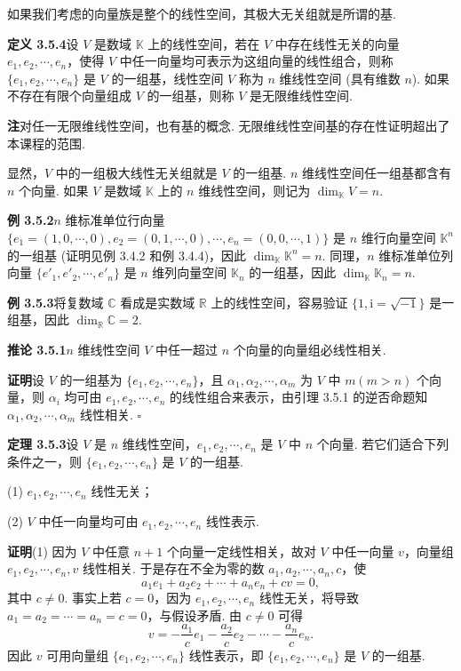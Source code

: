 \documentclass[UTF8, 12pt, fontset=fandol, oneside]{ctexart}
\begin{document}
如果我们考虑的向量族是整个的线性空间，其极大无关组就是所谓的基.

\noindent\textbf{定义 3.5.4}\quad 设 $V$ 是数域 $\mathbb{K}$ 上的线性空间，若在 $V$ 中存在线性无关的向量 $e_1,e_2,\cdots,e_n$，使得 $V$ 中任一向量均可表示为这组向量的线性组合，则称 $\{e_1,e_2,\cdots,e_n\}$ 是 $V$ 的一组基，线性空间 $V$ 称为 $n$ 维线性空间 (具有维数 $n$). 如果不存在有限个向量组成 $V$ 的一组基，则称 $V$ 是无限维线性空间.

\noindent\textbf{注}\quad 对任一无限维线性空间，也有基的概念. 无限维线性空间基的存在性证明超出了本课程的范围.

显然，$V$ 中的一组极大线性无关组就是 $V$ 的一组基. $n$ 维线性空间任一组基都含有 $n$ 个向量. 如果 $V$ 是数域 $\mathbb{K}$ 上的 $n$ 维线性空间，则记为 $\dim_{\mathbb{K}}V=n$.

\noindent\textbf{例 3.5.2}\quad $n$ 维标准单位行向量 $\{e_1=(1,0,\cdots,0),e_2=(0,1,\cdots,0),\cdots,e_n=(0,0,\cdots,1)\}$ 是 $n$ 维行向量空间 $\mathbb{K}^n$ 的一组基 (证明见例 3.4.2 和例 3.4.4)，因此 $\dim_{\mathbb{K}}\mathbb{K}^n=n$. 同理，$n$ 维标准单位列向量 $\{e'_1,e'_2,\cdots,e'_n\}$ 是 $n$ 维列向量空间 $\mathbb{K}_n$ 的一组基，因此 $\dim_{\mathbb{K}}\mathbb{K}_n=n$.

\noindent\textbf{例 3.5.3}\quad 将复数域 $\mathbb{C}$ 看成是实数域 $\mathbb{R}$ 上的线性空间，容易验证 $\{1,\mathrm{i}=\sqrt{-1}\}$ 是一组基，因此 $\dim_{\mathbb{R}}\mathbb{C}=2$.

\noindent\textbf{推论 3.5.1}\quad $n$ 维线性空间 $V$ 中任一超过 $n$ 个向量的向量组必线性相关.

\noindent\textbf{证明}\quad 设 $V$ 的一组基为 $\{e_1,e_2,\cdots,e_n\}$，且 $\alpha_1,\alpha_2,\cdots,\alpha_m$ 为 $V$ 中 $m(m>n)$ 个向量，则 $\alpha_i$ 均可由 $e_1,e_2,\cdots,e_n$ 的线性组合来表示，由引理 3.5.1 的逆否命题知 $\alpha_1,\alpha_2,\cdots,\alpha_m$ 线性相关. $\square$

\noindent\textbf{定理 3.5.3}\quad 设 $V$ 是 $n$ 维线性空间，$e_1,e_2,\cdots,e_n$ 是 $V$ 中 $n$ 个向量. 若它们适合下列条件之一，则 $\{e_1,e_2,\cdots,e_n\}$ 是 $V$ 的一组基.

(1) $e_1,e_2,\cdots,e_n$ 线性无关；

(2) $V$ 中任一向量均可由 $e_1,e_2,\cdots,e_n$ 线性表示.

\noindent\textbf{证明}\quad (1) 因为 $V$ 中任意 $n+1$ 个向量一定线性相关，故对 $V$ 中任一向量 $v$，向量组 $e_1,e_2,\cdots,e_n,v$ 线性相关. 于是存在不全为零的数 $a_1,a_2,\cdots,a_n,c$，使
\[
a_1e_1+a_2e_2+\cdots+a_ne_n+cv=0,
\]
其中 $c\neq 0$. 事实上若 $c=0$，因为 $e_1,e_2,\cdots,e_n$ 线性无关，将导致 $a_1=a_2=\cdots=a_n=c=0$，与假设矛盾. 由 $c\neq 0$ 可得
\[
v=-\frac{a_1}{c}e_1-\frac{a_2}{c}e_2-\cdots-\frac{a_n}{c}e_n.
\]
因此 $v$ 可用向量组 $\{e_1,e_2,\cdots,e_n\}$ 线性表示，即 $\{e_1,e_2,\cdots,e_n\}$ 是 $V$ 的一组基.
\end{document}
